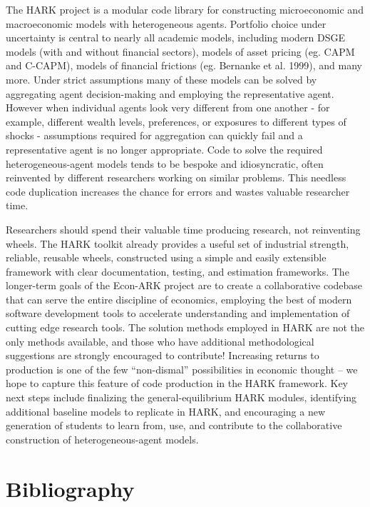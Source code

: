\documentclass[10pt,twocolumn]{article}
\begin{document}
The HARK project is a modular code library for constructing
microeconomic and macroeconomic models with heterogeneous agents.
Portfolio choice under uncertainty is central to nearly all academic
models, including modern DSGE models (with and without financial
sectors), models of asset pricing (eg. CAPM and C-CAPM), models of
financial frictions (eg. Bernanke et al. 1999), and many more. Under
strict assumptions many of these models can be solved by aggregating
agent decision-making and employing the representative agent. However
when individual agents look very different from one another - for
example, different wealth levels, preferences, or exposures to different
types of shocks - assumptions required for aggregation can quickly fail
and a representative agent is no longer appropriate. Code to solve the
required heterogeneous-agent models tends to be bespoke and
idiosyncratic, often reinvented by different researchers working on
similar problems. This needless code duplication increases the chance
for errors and wastes valuable researcher time.

Researchers should spend their valuable time producing research, not reinventing wheels. The HARK toolkit already provides a useful set of industrial strength, reliable, reusable  wheels, constructed using a simple and easily extensible framework with clear documentation, testing, and estimation frameworks.  The longer-term goals of the Econ-ARK project are to create a collaborative codebase that can serve the entire discipline of economics, employing the best of modern software development tools to accelerate understanding and implementation of cutting edge research tools. The solution methods employed in HARK are not the only methods available, and those who have additional methodological suggestions are strongly encouraged to contribute! Increasing returns to production is one of the few ``non-dismal'' possibilities in economic thought -- we hope to capture this feature of code production in the HARK framework. Key next steps include finalizing the general-equilibrium HARK modules, identifying additional baseline models to replicate in HARK, and encouraging a new generation of students to learn from, use, and contribute to the collaborative construction of heterogeneous-agent models.

\section*{Bibliography}\label{bibliography}
\end{document}
